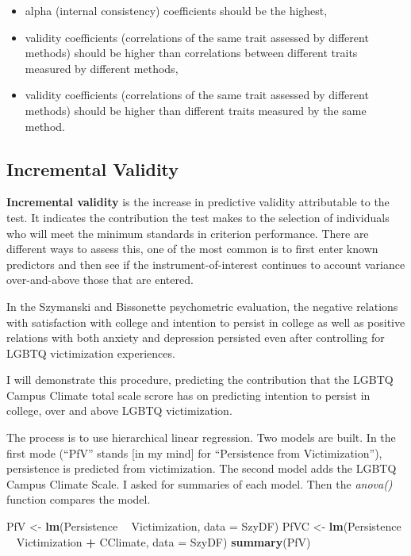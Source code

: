 \documentclass[
  english,
]{book}
\newenvironment{Shaded}{\begin{snugshade}}{\end{snugshade}}
\newcommand{\DataTypeTok}[1]{\textcolor[rgb]{0.13,0.29,0.53}{#1}}
\newcommand{\KeywordTok}[1]{\textcolor[rgb]{0.13,0.29,0.53}{\textbf{#1}}}
\newcommand{\NormalTok}[1]{#1}
\newcommand{\OperatorTok}[1]{\textcolor[rgb]{0.81,0.36,0.00}{\textbf{#1}}}
\newcommand{\StringTok}[1]{\textcolor[rgb]{0.31,0.60,0.02}{#1}}
\providecommand{\tightlist}{%
  \setlength{\itemsep}{0pt}\setlength{\parskip}{0pt}}
\begin{document}
\begin{itemize}
\tightlist
\item
  alpha (internal consistency) coefficients should be the highest,
\item
  validity coefficients (correlations of the same trait assessed by different methods) should be higher than correlations between different traits measured by different methods,
\item
  validity coefficients (correlations of the same trait assessed by different methods) should be higher than different traits measured by the same method.
\end{itemize}

\hypertarget{incremental-validity}{%
\subsection{Incremental Validity}\label{incremental-validity}}

\textbf{Incremental validity} is the increase in predictive validity attributable to the test. It indicates the contribution the test makes to the selection of individuals who will meet the minimum standards in criterion performance. There are different ways to assess this, one of the most common is to first enter known predictors and then see if the instrument-of-interest continues to account variance over-and-above those that are entered.

In the Szymanski and Bissonette \citeyearpar{szymanski_perceptions_2020} psychometric evaluation, the negative relations with satisfaction with college and intention to persist in college as well as positive relations with both anxiety and depression persisted even after controlling for LGBTQ victimization experiences.

I will demonstrate this procedure, predicting the contribution that the LGBTQ Campus Climate total scale scrore has on predicting intention to persist in college, over and above LGBTQ victimization.

The process is to use hierarchical linear regression. Two models are built. In the first mode (``PfV'' stands {[}in my mind{]} for ``Persistence from Victimization''), persistence is predicted from victimization. The second model adds the LGBTQ Campus Climate Scale. I asked for summaries of each model. Then the \emph{anova()} function compares the model.

\begin{Shaded}
\begin{Highlighting}[]
\NormalTok{PfV <-}\StringTok{ }\KeywordTok{lm}\NormalTok{(Persistence }\OperatorTok{~}\StringTok{ }\NormalTok{Victimization, }\DataTypeTok{data =}\NormalTok{ SzyDF)}
\NormalTok{PfVC <-}\StringTok{ }\KeywordTok{lm}\NormalTok{(Persistence }\OperatorTok{~}\StringTok{ }\NormalTok{Victimization }\OperatorTok{+}\StringTok{ }\NormalTok{CClimate, }\DataTypeTok{data =}\NormalTok{ SzyDF)}
\KeywordTok{summary}\NormalTok{(PfV)}
\end{Highlighting}
\end{Shaded}
\end{document}
